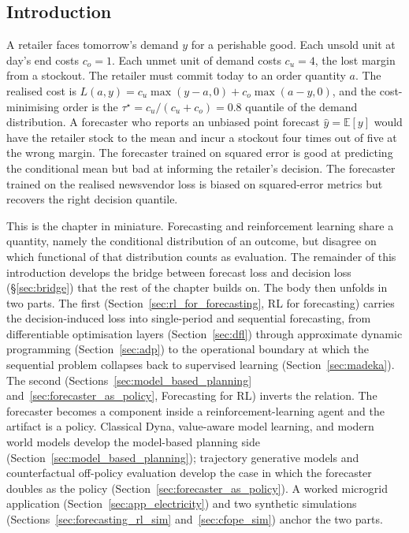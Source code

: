 \subsection{Introduction}
\label{sec:forecasting_rl_intro}

A retailer faces tomorrow's demand $y$ for a perishable good. Each unsold
unit at day's end costs $c_o = 1$. Each unmet unit of demand costs
$c_u = 4$, the lost margin from a stockout. The retailer must commit today
to an order quantity $a$. The realised cost is
$L(a, y) = c_u \max(y - a, 0) + c_o \max(a - y, 0)$, and the cost-minimising
order is the $\tau^\star = c_u / (c_u + c_o) = 0.8$ quantile of the
demand distribution. A forecaster who reports an unbiased point forecast
$\hat y = \mathbb E[y]$ would have the retailer stock to the mean and incur
a stockout four times out of five at the wrong margin. The forecaster trained
on squared error is good at predicting the conditional mean but bad at
informing the retailer's decision. The forecaster trained on the realised
newsvendor loss is biased on squared-error metrics but recovers the right
decision quantile.

This is the chapter in miniature. Forecasting and reinforcement learning
share a quantity, namely the conditional distribution of an outcome, but
disagree on which functional of that distribution counts as evaluation.
The remainder of this introduction develops the bridge between forecast
loss and decision loss (\S\ref{sec:bridge}) that the rest of the chapter
builds on. The body then unfolds in two parts. The first
(Section~\ref{sec:rl_for_forecasting}, RL for forecasting) carries the
decision-induced loss into single-period and sequential forecasting,
from differentiable optimisation layers (Section~\ref{sec:dfl}) through
approximate dynamic programming (Section~\ref{sec:adp}) to the
operational boundary at which the sequential problem collapses back to
supervised learning (Section~\ref{sec:madeka}). The second
(Sections~\ref{sec:model_based_planning} and~\ref{sec:forecaster_as_policy},
Forecasting for RL) inverts the relation. The forecaster becomes a
component inside a reinforcement-learning agent and the artifact is a
policy. Classical Dyna, value-aware model learning, and modern world
models develop the model-based planning side
(Section~\ref{sec:model_based_planning}); trajectory generative models
and counterfactual off-policy evaluation develop the case in which the
forecaster doubles as the policy
(Section~\ref{sec:forecaster_as_policy}). A worked microgrid application
(Section~\ref{sec:app_electricity}) and two synthetic simulations
(Sections~\ref{sec:forecasting_rl_sim} and~\ref{sec:cfope_sim}) anchor
the two parts.

